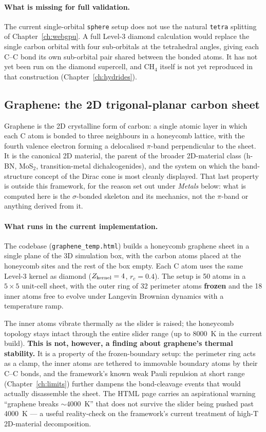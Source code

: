\paragraph{What is missing for full validation.}
The current single-orbital \texttt{sphere} setup does not use the natural \texttt{tetra} splitting of Chapter~\ref{ch:webgpu}. A full Level-3 diamond calculation would replace the single carbon orbital with four sub-orbitals at the tetrahedral angles, giving each C--C bond its own sub-orbital pair shared between the bonded atoms. It has not yet been run on the diamond supercell, and CH$_4$ itself is not yet reproduced in that construction (Chapter~\ref{ch:hydrides}).

\subsection{Graphene: the 2D trigonal-planar carbon sheet}

Graphene is the 2D crystalline form of carbon: a single atomic layer in which each C atom is bonded to three neighbours in a honeycomb lattice, with the fourth valence electron forming a delocalised $\pi$-band perpendicular to the sheet. It is the canonical 2D material, the parent of the broader 2D-material class (h-BN, MoS$_2$, transition-metal dichalcogenides), and the system on which the band-structure concept of the Dirac cone is most cleanly displayed. That last property is outside this framework, for the reason set out under \emph{Metals} below: what is computed here is the $\sigma$-bonded skeleton and its mechanics, not the $\pi$-band or anything derived from it.

\paragraph{What runs in the current implementation.}
The codebase (\texttt{graphene\_temp.html}) builds a honeycomb graphene sheet in a single plane of the 3D simulation box, with the carbon atoms placed at the honeycomb sites and the rest of the box empty. Each C atom uses the same Level-3 kernel as diamond ($Z_{\rm kernel} = 4$, $r_c = 0.4$). The setup is 50 atoms in a $5 \times 5$ unit-cell sheet, with the outer ring of 32 perimeter atoms \textbf{frozen} and the 18 inner atoms free to evolve under Langevin Brownian dynamics with a temperature ramp.

The inner atoms vibrate thermally as the slider is raised; the honeycomb topology stays intact through the entire slider range (up to 8000~K in the current build). \textbf{This is not, however, a finding about graphene's thermal stability.} It is a property of the frozen-boundary setup: the perimeter ring acts as a clamp, the inner atoms are tethered to immovable boundary atoms by their C--C bonds, and the framework's known weak Pauli repulsion at short range (Chapter~\ref{ch:limits}) further dampens the bond-cleavage events that would actually disassemble the sheet. The HTML page carries an aspirational warning ``graphene breaks $\sim 4000$~K'' that does not survive the slider being pushed past 4000~K --- a useful reality-check on the framework's current treatment of high-T 2D-material decomposition.

